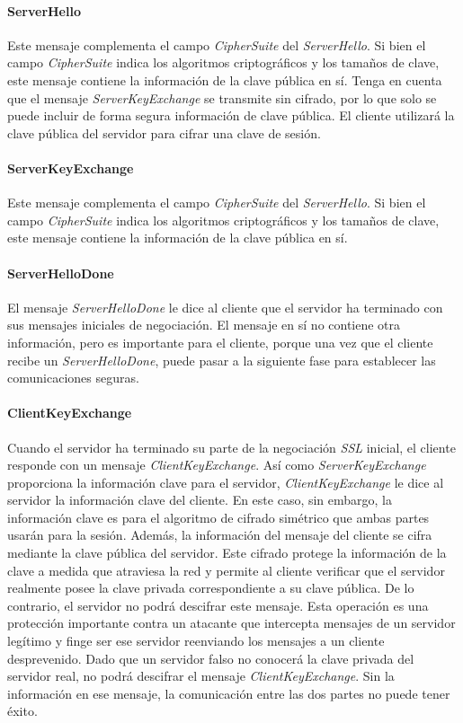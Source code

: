 \paragraph*{ServerHello}
Este mensaje complementa el campo \emph{CipherSuite} del \emph{ServerHello}. Si bien 
el campo \emph{CipherSuite} indica los algoritmos criptográficos y los tamaños 
de clave, este mensaje contiene la información de la clave pública en sí. 
Tenga en cuenta que el mensaje \emph{ServerKeyExchange} se transmite sin cifrado, 
por lo que solo se puede incluir de forma segura información de clave 
pública. El cliente utilizará la clave pública del servidor para cifrar 
una clave de sesión.

\paragraph*{ServerKeyExchange}

Este mensaje complementa el campo \emph{CipherSuite} del \emph{ServerHello}. 
Si bien el campo \emph{CipherSuite} indica los algoritmos criptográficos y 
los tamaños de clave, este mensaje contiene la información de la clave 
pública en sí. 

\paragraph*{ServerHelloDone}
El mensaje \emph{ServerHelloDone} le dice al cliente que el servidor ha 
terminado con sus mensajes iniciales de negociación. El mensaje en 
sí no contiene otra información, pero es importante para el cliente, 
porque una vez que el cliente recibe un \emph{ServerHelloDone}, puede pasar a 
la siguiente fase para establecer las comunicaciones seguras.

\paragraph*{ClientKeyExchange}
Cuando el servidor ha terminado su parte de la negociación \emph{SSL} inicial, 
el cliente responde con un mensaje \emph{ClientKeyExchange}. Así como 
\emph{ServerKeyExchange} proporciona la información clave para el servidor, 
\emph{ClientKeyExchange} le dice al servidor la información clave del cliente. 
En este caso, sin embargo, la información clave es para el algoritmo de 
cifrado simétrico que ambas partes usarán para la sesión. Además, la 
información del mensaje del cliente se cifra mediante la clave pública 
del servidor. Este cifrado protege la información de la clave a medida 
que atraviesa la red y permite al cliente verificar que el servidor 
realmente posee la clave privada correspondiente a su clave pública. 
De lo contrario, el servidor no podrá descifrar este mensaje. Esta 
operación es una protección importante contra un atacante que intercepta 
mensajes de un servidor legítimo y finge ser ese servidor reenviando los 
mensajes a un cliente desprevenido. Dado que un servidor falso no conocerá 
la clave privada del servidor real, no podrá descifrar el mensaje 
\emph{ClientKeyExchange}. Sin la información en ese mensaje, la comunicación 
entre las dos partes no puede tener éxito.
